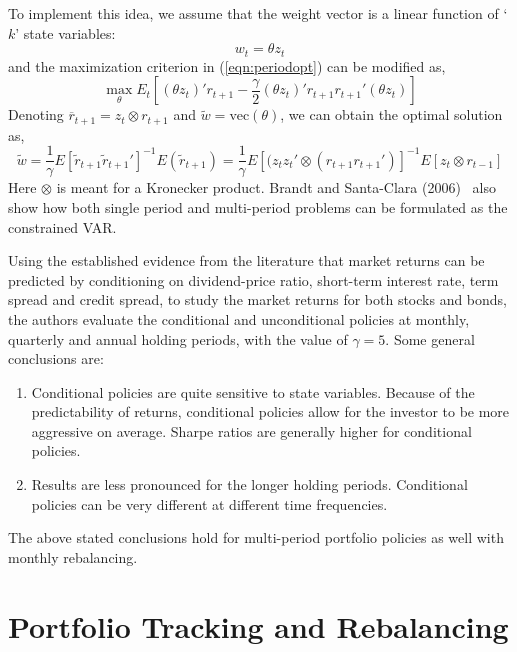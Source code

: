 To implement this idea, we assume that the weight vector is a linear function of `$k$' state variables:
	\begin{equation}\label{eqn:statevar}
	w_t= \theta z_t
	\end{equation}
and the maximization criterion in (\ref{eqn:periodopt}) can be modified as,
	\begin{equation}\label{eqn:prevmodified}
	\max_\theta E_t\left[(\theta z_t)' r_{t+1} - \frac{\gamma}{2}(\theta z_t)' r_{t+1} r_{t+1}' (\theta z_t)\right]
	\end{equation}
Denoting $\overline{r}_{t+1}=z_t \otimes r_{t+1}$ and $\tilde{w}=\text{vec}(\theta)$, we can obtain the optimal solution as,
	\begin{equation} \label{eqn:modifiedsolution}
	\tilde{w}= \frac{1}{\gamma} E[\tilde{r}_{t+1} \tilde{r}_{t+1}']^{-1} E(\tilde{r}_{t+1})= \frac{1}{\gamma} E[(z_t z_t' \otimes (r_{t+1}r_{t+1}')]^{-1} E[z_t \otimes r_{t-1}]
	\end{equation}
Here $\otimes$ is meant for a Kronecker product. Brandt and Santa-Clara (2006)~\cite{bransc} also show how both single period and multi-period problems can be formulated as the constrained VAR. 


Using the established evidence from the literature that market returns can be predicted by conditioning on dividend-price ratio, short-term interest rate, term spread and credit spread, to study the market returns for both stocks and bonds, the authors evaluate the conditional and unconditional policies at monthly, quarterly and annual holding periods, with the value of $\gamma=5$. Some general conclusions are:
	\begin{enumerate}[--]
	\item Conditional policies are quite sensitive to state variables. Because of the predictability of returns, conditional policies allow for the investor to be more aggressive on average. Sharpe ratios are generally higher for conditional policies.
	\item Results are less pronounced for the longer holding periods. Conditional policies can be very different at different time frequencies. 
	\end{enumerate}
The above stated conclusions hold for multi-period portfolio policies as well with monthly rebalancing. 



\section{Portfolio Tracking and Rebalancing}


